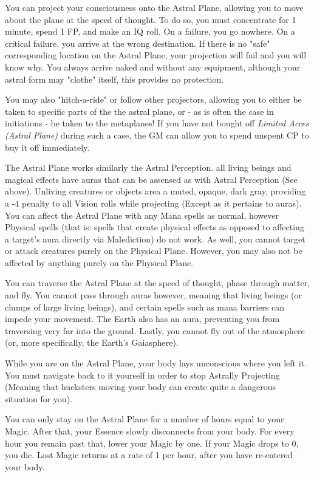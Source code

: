 \begin{multicols*}{3}
	You can project your consciousness onto the Astral Plane, allowing you to move about the plane at the speed of thought. To do so, you must concentrate for 1 minute, spend 1 FP, and make an IQ roll. On a failure, you go nowhere. On a critical failure, you arrive at the wrong destination. If there is no "safe" corresponding location on the Astral Plane, your projection will fail and you will know why. You always arrive naked and without any equipment, although your astral form may "clothe" itself, this provides no protection.
	
	You may also "hitch-a-ride" or follow other projectors, allowing you to either be taken to specific parts of the the astral plane, or - as is often the case in initiations - be taken to the metaplanes! If you have not bought off \textit{Limited Acces (Astral Plane)} during such a case, the GM can allow you to spend unspent CP to buy it off immediately.
	
	The Astral Plane works similarly the Astral Perception. all living beings and magical effects have auras that can be assensed as with Astral Perception (See above). Unliving creatures or objects area a muted, opaque, dark gray, providing a -4 penalty to all Vision rolls while projecting (Except as it pertains to auras). You can affect the Astral Plane with any Mana spells as normal, however Physical spells (that is: spells that create physical effects as opposed to affecting a target's aura directly via Malediction) do not work. As well, you cannot target or attack creatures purely on the Physical Plane. However, you may also not be affected by anything purely on the Physical Plane.
	
	You can traverse the Astral Plane at the speed of thought, phase through matter, and fly. You cannot pass through auras however, meaning that living beings (or clumps of large living beings), and certain spells such as mana barriers can impede your movement. The Earth also has an aura, preventing you from traversing very far into the ground. Lastly, you cannot fly out of the atmosphere (or, more specifically, the Earth's Gaiasphere).
	
	While you are on the Astral Plane, your body lays unconscious where you left it. You must navigate back to it yourself in order to stop Astrally Projecting (Meaning that hucksters moving your body can create quite a dangerous situation for you).
	
	You can only stay on the Astral Plane for a number of hours equal to your Magic. After that, your Essence slowly disconnects from your body. For every hour you remain past that, lower your Magic by one. If your Magic drops to 0, you die. Lost Magic returns at a rate of 1 per hour, after you have re-entered your body.
	

\end{multicols*}
